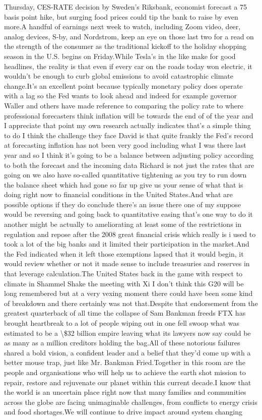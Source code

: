 \documentclass{article}%
\begin{document}
Thursday, CES{-}RATE decision by Sweden's Riksbank, economist forecast a 75 basis point hike, but surging food prices could tip the bank to raise by even more.A handful of earnings next week to watch, including Zoom video, deer, analog devices, S{-}by, and Nordstrom, keep an eye on those last two for a read on the strength of the consumer as the traditional kickoff to the holiday shopping season in the U.S. begins on Friday.While Tesla's in the like make for good headlines, the reality is that even if every car on the roads today won electric, it wouldn't be enough to curb global emissions to avoid catastrophic climate change.It's an excellent point because typically monetary policy does operate with a lag so the Fed wants to look ahead and indeed for example governor Waller and others have made reference to comparing the policy rate to where professional forecasters think inflation will be towards the end of of the year and I appreciate that point my own research actually indicates that's a simple thing to do I think the challenge they face David is that quite frankly the Fed's record at forecasting inflation has not been very good including what I was there last year and so I think it's going to be a balance between adjusting policy according to both the forecast and the incoming data Richard is not just the rates that are going on we also have so{-}called quantitative tightening as you try to run down the balance sheet which had gone so far up give us your sense of what that is doing right now to financial conditions in the United States.And what are possible options if they do conclude there's an issue there one of my suppose would be reversing and going back to quantitative easing that's one way to do it another might be actually to ameliorating at least some of the restrictions in regulation and repose after the 2008 great financial crisis which really is i used to took a lot of the big banks and it limited their participation in the market.And the Fed indicated when it left those exemptions lapsed that it would begin, it would review whether or not it made sense to include treasuries and reserves in that leverage calculation.The United States back in the game with respect to climate in Shammel Shake the meeting with Xi I don't think this G20 will be long remembered but at a very vexing moment there could have been some kind of breakdown and there certainly was not that.Despite that endorsement from the greatest quarterback of all time the collapse of Sam Bankman freeds FTX has brought heartbreak to a lot of people wiping out in one fell swoop what was estimated to be a \textbackslash{}\$32 billion empire leaving what its lawyers now say could be as many as a million creditors holding the bag.All of these notorious failures shared a bold vision, a confident leader and a belief that they'd come up with a better mouse trap, just like Mr. Bankman Fried.Together in this room are the people and organisations who will help us to achieve the earth shot mission to repair, restore and rejuvenate our planet within this current decade.I know that the world is an uncertain place right now that many families and communities across the globe are facing unimaginable challenges, from conflicts to energy crisis and food shortages.We will continue to drive impact around system changing 
\end{document}

